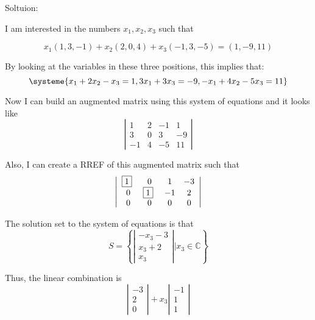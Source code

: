 \documentclass{article}
\begin{document}
\bigskip

Soltuion:

I am interested in the numbers \(x_1, x_2, x_3\) such that

\begin{equation}
x_1(1,3,-1) + x_2(2,0,4) + x_3(-1,3,-5) = (1,-9,11)
\end{equation}

By looking at the variables in these three positions, this implies that:
\begin{equation}
  \systeme {
  x_1 + 2x_2 - x_3 = 1,
  3x_1 + 3x_3 = -9,
  -x_1 + 4x_2 - 5x_3 = 11
  }
\end{equation}

Now I can build an augmented matrix using this system of equations and it looks like
\begin{equation}
   \left| \begin{array}{cccc}
  1 & 2 & -1 & 1 \\
  3 & 0 & 3 & -9 \\
  -1 & 4 & -5 & 11
  \end{array} \right|
\end{equation}

Also, I can create a RREF of this augmented matrix such that
\begin{equation}
 \left| \begin{array}{cccc}
  $\boxed{1}$~ & 0 & 1 & -3 \\
  0 & $\boxed{1}$~ & -1 & 2 \\
  0 & 0 & 0 & 0
  \end{array} \right|
\end{equation}

The solution set to the system of equations is that
\begin{equation}
S=
\left\{
\left| \begin{array}{c}
-x_3-3 \\
x_3+2 \\
x_3
\end{array} \right|
|
x_3\in\mathbb{C}
\right\}
\end{equation}

Thus, the linear combination is
\begin{equation}
\left| \begin{array}{c}
-3 \\
2 \\
0
\end{array} \right|
+
x_3
\left| \begin{array}{c}
-1 \\
1 \\
1
\end{array} \right|
\end{equation}
\end{document}
